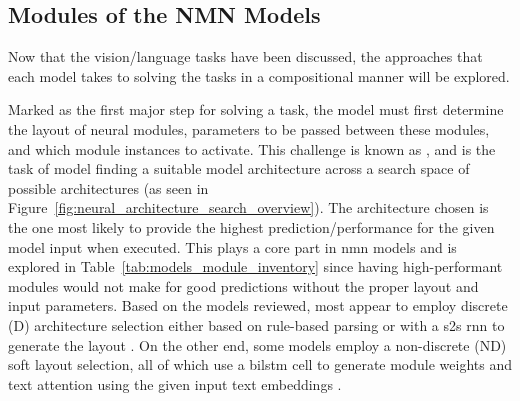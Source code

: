 \subsection{Modules of the NMN Models}
\label{subsec:modules_of_the_nmn_models}

Now that the vision/language tasks have been discussed, the approaches that each model takes to solving the tasks in a compositional manner will be explored.

Marked as the first major step for solving a task, the model must first determine the layout of neural modules, parameters to be passed between these modules, and which module instances to activate.
This challenge is known as , and is the task of model finding a suitable model architecture across a search space of possible architectures (as seen in Figure~\ref{fig:neural_architecture_search_overview})\cite{elsken_neural_2019}.
The architecture chosen is the one most likely to provide the highest prediction/performance for the given model input when executed.
This plays a core part in \gls{nmn} models and is explored in Table~\ref{tab:models_module_inventory} since having high-performant modules would not make for good predictions without the proper layout and input parameters.
Based on the models reviewed, most appear to employ discrete (D) architecture selection either based on rule-based parsing \cite{andreas_neural_2016,chen_meta_2020} or with a \gls{s2s} \gls{rnn} to generate the layout \cite{hu_learning_2017,chen_teaching_2022,su_toward_2020,kottur_visual_2018,cho_visual_2021}.
On the other end, some models employ a non-discrete (ND) soft layout selection, all of which use a \gls{bilstm} cell to generate module weights and text attention using the given input text embeddings \cite{hu_explainable_2019,hudson_compositional_2018,pahuja_learning_2019}.

